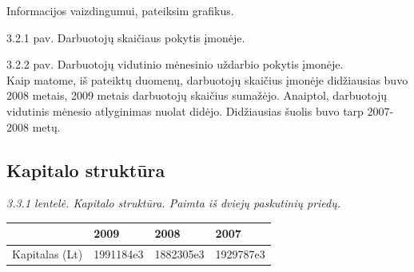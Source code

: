 \documentclass[11pt,a4paper]{article}
\begin{document}
Informacijos vaizdingumui, pateiksim grafikus.
\begin{center}
\end{center}
\textsf{3.2.1 pav. Darbuotojų skaičiaus pokytis įmonėje.}\\

\begin{center}
\end{center}
\textsf{3.2.2 pav. Darbuotojų vidutinio mėnesinio uždarbio pokytis įmonėje.}\\

Kaip matome, iš pateiktų duomenų, darbuotojų skaičius įmonėje didžiausias buvo 
2008 metais, 2009 metais darbuotojų skaičius sumažėjo. Anaiptol, darbuotojų 
vidutinis mėnesio atlyginimas nuolat didėjo. Didžiausias šuolis buvo tarp 
2007-2008 metų.

\subsection{Kapitalo struktūra}

\textsl{3.3.1 lentelė. Kapitalo struktūra. Paimta iš dviejų paskutinių priedų.}\\
\begin{tabular}{|p{5cm}|p{3cm}|p{3cm}|p{3cm}|} \hline
		& 2009 & 2008 & 2007 \\ \hline
	Kapitalas (Lt) & 1991184e3 & 1882305e3 & 1929787e3 \\ \hline
\end{tabular}\\\\
\end{document}
